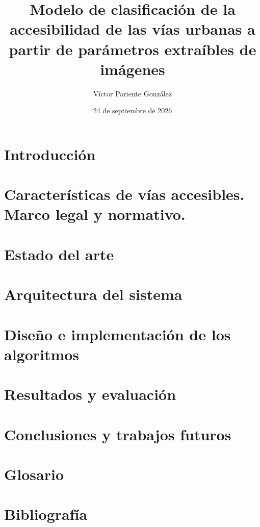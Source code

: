 \documentclass[IB]{TFUOC}%
\title{Modelo de clasificación de la accesibilidad de las vías urbanas a partir de parámetros extraíbles de imágenes}
\author{Víctor Pariente González}
\date{24 de septiembre de 2026}
\begin{document}
\estructura

{\hypersetup{linkcolor=black}\tableofcontents}

{\hypersetup{linkcolor=black}\listoffigures}

{\hypersetup{linkcolor=black}\listoftables}




\chapter{Introducción}


\chapter{Características de vías accesibles. Marco legal y normativo.}



\chapter{Estado del arte}


\chapter{Arquitectura del sistema}


\chapter{Diseño e implementación de los algoritmos}


\chapter{Resultados y evaluación}


\chapter{Conclusiones y trabajos futuros}


\chapter{Glosario}


\chapter{Bibliografía}

\end{document}
